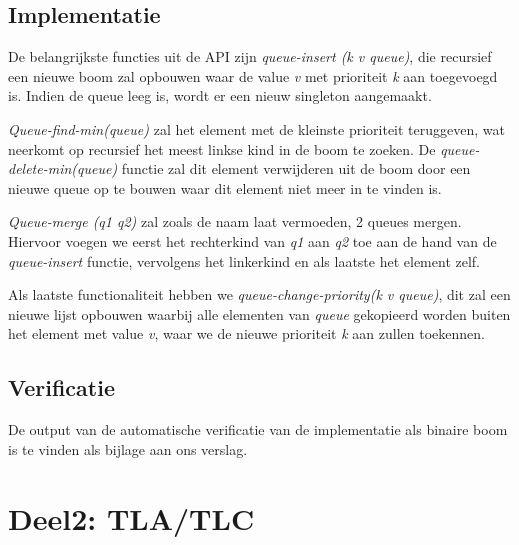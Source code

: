 \documentclass[a4paper,10pt]{article}
\begin{document}
\subsection{Implementatie}
De belangrijkste functies uit de API zijn \emph{queue-insert (k v queue)}, die recursief een nieuwe boom zal opbouwen waar de value \emph{v} met prioriteit \emph{k} aan toegevoegd is. Indien de queue leeg is, wordt er een nieuw singleton aangemaakt. 

\emph{Queue-find-min(queue)} zal het element met de kleinste prioriteit  teruggeven, wat neerkomt op recursief het meest linkse kind in de boom te zoeken. De \emph{queue-delete-min(queue)} functie zal dit element verwijderen uit de boom door een nieuwe queue op te bouwen waar dit element niet meer in te vinden is.  

\emph{Queue-merge (q1 q2)} zal zoals de naam laat vermoeden, 2 queues mergen. Hiervoor voegen we eerst het rechterkind van \emph{q1} aan \emph{q2} toe aan de hand van de \emph{queue-insert} functie, vervolgens het linkerkind en als laatste het element zelf. 

Als laatste functionaliteit hebben we \emph{queue-change-priority(k v queue)}, dit zal een nieuwe lijst opbouwen waarbij alle elementen van \emph{queue} gekopieerd worden buiten het element met value \emph{v}, waar we de nieuwe prioriteit \emph{k} aan zullen toekennen.

\subsection{Verificatie}

De output van de automatische verificatie van de implementatie als binaire boom is te vinden als bijlage aan ons verslag. 

\section{Deel2: TLA/TLC}
\end{document}
